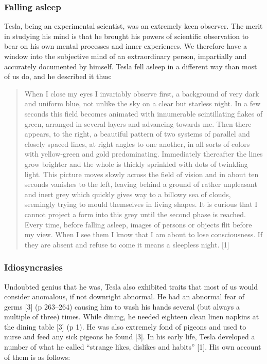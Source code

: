 \documentclass[
  11pt,
  a4paper,
]{article}
\begin{document}
\hypertarget{falling-asleep}{%
\subsubsection{Falling asleep}\label{falling-asleep}}

Tesla, being an experimental scientist, was an extremely keen observer.
The merit in studying his mind is that he brought his powers of
scientific observation to bear on his own mental processes and inner
experiences. We therefore have a window into the subjective mind of an
extraordinary person, impartially and accurately documented by himself.
Tesla fell asleep in a different way than most of us do, and he
described it thus:

\begin{quote}
When I close my eyes I invariably observe first, a background of very
dark and uniform blue, not unlike the sky on a clear but starless night.
In a few seconds this field becomes animated with innumerable
scintillating flakes of green, arranged in several layers and advancing
towards me. Then there appears, to the right, a beautiful pattern of two
systems of parallel and closely spaced lines, at right angles to one
another, in all sorts of colors with yellow-green and gold
predominating. Immediately thereafter the lines grow brighter and the
whole is thickly sprinkled with dots of twinkling light. This picture
moves slowly across the field of vision and in about ten seconds
vanishes to the left, leaving behind a ground of rather unpleasant and
inert grey which quickly gives way to a billowy sea of clouds, seemingly
trying to mould themselves in living shapes. It is curious that I cannot
project a form into this grey until the second phase is reached. Every
time, before falling asleep, images of persons or objects flit before my
view. When I see them I know that I am about to lose consciousness. If
they are absent and refuse to come it means a sleepless night. {[}1{]}
\end{quote}

\hypertarget{idiosyncrasies}{%
\subsubsection{Idiosyncrasies}\label{idiosyncrasies}}

Undoubted genius that he was, Tesla also exhibited traits that most of
us would consider anomalous, if not downright abnormal. He had an
abnormal fear of germs {[}3{]} (p 263--264) causing him to wash his
hands several (but always a multiple of three) times. While dining, he
needed eighteen clean linen napkins at the dining table {[}3{]} (p 1).
He was also extremely fond of pigeons and used to nurse and feed any
sick pigeons he found {[}3{]}. In his early life, Tesla developed a
number of what he called ``strange likes, dislikes and habits'' {[}1{]}.
His own account of them is as follows:
\end{document}
